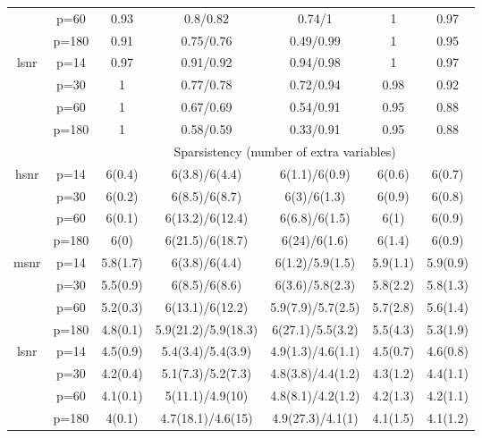 \begin{table}[ht]
{\begin{tabular}{|c|c|ccccc|}
   & p=60 & 0.93 & 0.8/0.82 & 0.74/1 & 1 & 0.97 \\ 
   & p=180 & 0.91 & 0.75/0.76 & 0.49/0.99 & 1 & 0.95 \\ 
  \midrule\multirow{4}[2]{*}{lsnr} & p=14 & 0.97 & 0.91/0.92 & 0.94/0.98 & 1 & 0.97 \\ 
   & p=30 & 1 & 0.77/0.78 & 0.72/0.94 & 0.98 & 0.92 \\ 
   & p=60 & 1 & 0.67/0.69 & 0.54/0.91 & 0.95 & 0.88 \\ 
   & p=180 & 1 & 0.58/0.59 & 0.33/0.91 & 0.95 & 0.88 \\ 
   \midrule 
 \multicolumn{1}{|c}{} &       & \multicolumn{5}{c|}{Sparsistency (number of extra variables)} \\
\midrule\multirow{4}[2]{*}{hsnr} & p=14 & 6(0.4) & 6(3.8)/6(4.4) & 6(1.1)/6(0.9) & 6(0.6) & 6(0.7) \\ 
   & p=30 & 6(0.2) & 6(8.5)/6(8.7) & 6(3)/6(1.3) & 6(0.9) & 6(0.8) \\ 
   & p=60 & 6(0.1) & 6(13.2)/6(12.4) & 6(6.8)/6(1.5) & 6(1) & 6(0.9) \\ 
   & p=180 & 6(0) & 6(21.5)/6(18.7) & 6(24)/6(1.6) & 6(1.4) & 6(0.9) \\ 
  \midrule\multirow{4}[2]{*}{msnr} & p=14 & 5.8(1.7) & 6(3.8)/6(4.4) & 6(1.2)/5.9(1.5) & 5.9(1.1) & 5.9(0.9) \\ 
   & p=30 & 5.5(0.9) & 6(8.5)/6(8.6) & 6(3.6)/5.8(2.3) & 5.8(2.2) & 5.8(1.3) \\ 
   & p=60 & 5.2(0.3) & 6(13.1)/6(12.2) & 5.9(7.9)/5.7(2.5) & 5.7(2.8) & 5.6(1.4) \\ 
   & p=180 & 4.8(0.1) & 5.9(21.2)/5.9(18.3) & 6(27.1)/5.5(3.2) & 5.5(4.3) & 5.3(1.9) \\ 
  \midrule\multirow{4}[2]{*}{lsnr} & p=14 & 4.5(0.9) & 5.4(3.4)/5.4(3.9) & 4.9(1.3)/4.6(1.1) & 4.5(0.7) & 4.6(0.8) \\ 
   & p=30 & 4.2(0.4) & 5.1(7.3)/5.2(7.3) & 4.8(3.8)/4.4(1.2) & 4.3(1.2) & 4.4(1.1) \\ 
   & p=60 & 4.1(0.1) & 5(11.1)/4.9(10) & 4.8(8.1)/4.2(1.2) & 4.2(1.3) & 4.2(1.1) \\ 
   & p=180 & 4(0.1) & 4.7(18.1)/4.6(15) & 4.9(27.3)/4.1(1) & 4.1(1.5) & 4.1(1.2) \\ 
   \bottomrule 
\end{tabular}
}
\end{table}
